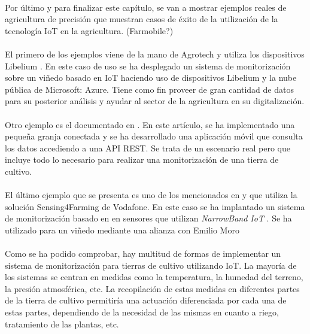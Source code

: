 \documentclass[../../memoria.tex]{subfiles}
\begin{document}
\paragraph{}
Por último y para finalizar este capítulo, se van a mostrar ejemplos reales de agricultura de precisión que muestran casos de éxito de la utilización de la tecnología IoT en la agricultura.
(Farmobile?)

\paragraph{}
El primero de los ejemplos viene de la mano de Agrotech y utiliza los dispositivos Libelium \cite{libeliumusecase1}. En este caso de uso se ha desplegado un sistema de monitorización sobre un viñedo basado en IoT haciendo uso de dispositivos Libelium y la nube pública de Microsoft: Azure. Tiene como fin proveer de gran cantidad de datos para su posterior análisis y ayudar al sector de la agricultura en su digitalización.

\paragraph{}
Otro ejemplo es el documentado en \cite{inproceedings}. En este artículo, se ha implementado una pequeña granja conectada y se ha desarrollado una aplicación móvil que consulta los datos accediendo a una API REST. Se trata de un escenario real pero que incluye todo lo necesario para realizar una monitorización de una tierra de cultivo.

\paragraph{}
El último ejemplo que se presenta es uno de los mencionados en \cite{vodafones} y que utiliza la solución Sensing4Farming de Vodafone. En este caso se ha implantado un sistema de monitorización basado en en sensores que utilizan \textit{NarrowBand IoT} \cite{narrowband}. Se ha utilizado para un viñedo mediante una alianza con Emilio Moro \cite{emiliomoro}

\paragraph{}
Como se ha podido comprobar, hay multitud de formas de implementar un sistema de monitorización para tierras de cultivo utilizando IoT. La mayoría de los sistemas se centran en medidas como la temperatura, la humedad del terreno, la presión atmosférica, etc. La recopilación de estas medidas en diferentes partes de la tierra de cultivo permitiría una actuación diferenciada por cada una de estas partes, dependiendo de la necesidad de las mismas en cuanto a riego, tratamiento de las plantas, etc.
\end{document}
